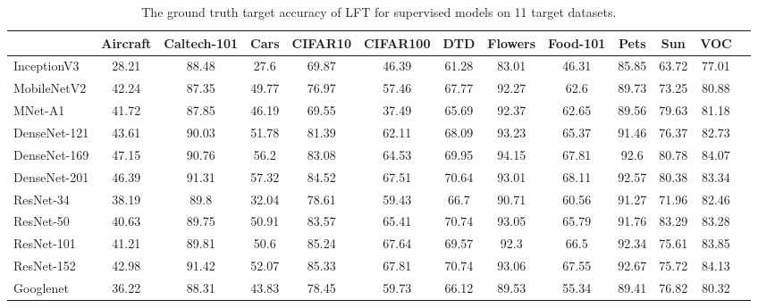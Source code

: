 \begin{table*}\setlength\tabcolsep{5pt}
\footnotesize
\centering
\caption{The ground truth target accuracy of LFT for supervised models on 11 target datasets.}
\label{tab:lft_supervised}
\begin{adjustbox}{max width=\textwidth}
\begin{tabular}{lcccccccccccc}
\toprule
& Aircraft & Caltech-101 & Cars & CIFAR10 & CIFAR100 & DTD & Flowers & Food-101 & Pets & Sun & VOC \\
\midrule
InceptionV3 & 28.21 & 88.48 & 27.6 & 69.87 & 46.39 & 61.28 & 83.01 & 46.31 & 85.85 & 63.72 & 77.01 \\
MobileNetV2 & 42.24 & 87.35 & 49.77 & 76.97 & 57.46 & 67.77 & 92.27 & 62.6 & 89.73 & 73.25 & 80.88 \\
MNet-A1 & 41.72 & 87.85 & 46.19 & 69.55 & 37.49 & 65.69 & 92.37 & 62.65 & 89.56 & 79.63 & 81.18 \\
DenseNet-121 & 43.61 & 90.03 & 51.78 & 81.39 & 62.11 & 68.09 & 93.23 & 65.37 & 91.46 & 76.37 & 82.73 \\
DenseNet-169 & 47.15 & 90.76 & 56.2 & 83.08 & 64.53 & 69.95 & 94.15 & 67.81 & 92.6 & 80.78 & 84.07 \\
DenseNet-201 & 46.39 & 91.31 & 57.32 & 84.52 & 67.51 & 70.64 & 93.01 & 68.11 & 92.57 & 80.38 & 83.34 \\
ResNet-34 & 38.19 & 89.8 & 32.04 & 78.61 & 59.43 & 66.7 & 90.71 & 60.56 & 91.27 & 71.96 & 82.46 \\
ResNet-50 & 40.63 & 89.75 & 50.91 & 83.57 & 65.41 & 70.74 & 93.05 & 65.79 & 91.76 & 83.29 & 83.28 \\
ResNet-101 & 41.21 & 89.81 & 50.6 & 85.24 & 67.64 & 69.57 & 92.3 & 66.5 & 92.34 & 75.61 & 83.85 \\
ResNet-152 & 42.98 & 91.42 & 52.07 & 85.33 & 67.81 & 70.74 & 93.06 & 67.55 & 92.67 & 75.72 & 84.13 \\
Googlenet & 36.22 & 88.31 & 43.83 & 78.45 & 59.73 & 66.12 & 89.53 & 55.34 & 89.41 & 76.82 & 80.32 \\
\bottomrule
\end{tabular}
\end{adjustbox}
\end{table*}



